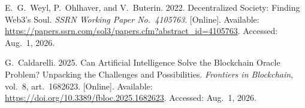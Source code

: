 {\begin{enumerate}[label={[\arabic*]}]


\item E.~G.~Weyl, P.~Ohlhaver, and V.~Buterin. 2022. Decentralized Society: Finding Web3's Soul. \emph{SSRN Working Paper No.~4105763}. [Online]. Available: \url{https://papers.ssrn.com/sol3/papers.cfm?abstract_id=4105763}. Accessed: Aug.~1, 2026.


\item G.~Caldarelli. 2025. Can Artificial Intelligence Solve the Blockchain Oracle Problem? Unpacking the Challenges and Possibilities. \emph{Frontiers in Blockchain}, vol.~8, art.~1682623. [Online]. Available: \url{https://doi.org/10.3389/fbloc.2025.1682623}. Accessed: Aug.~1, 2026.




\end{enumerate}}
